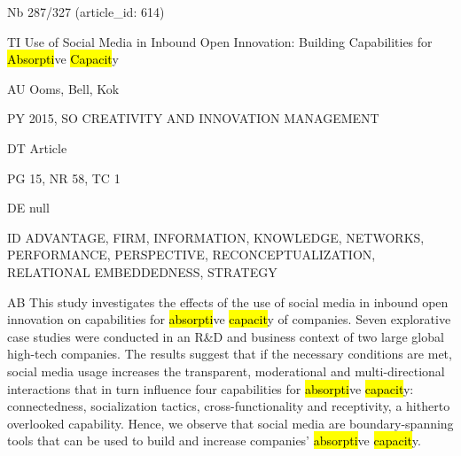 \documentclass[a4paper]{article}
\begin{document}
\vspace*{-2cm}
Nb \tabto{0cm}287/327 (article\_id: 614)\par
TI \tabto{0cm}Use of Social Media in Inbound Open Innovation: Building Capabilities for \hl{Absorpti}ve \hl{Capacit}y\par
AU \tabto{0cm}Ooms, Bell, Kok\par
PY \tabto{0cm}2015, SO CREATIVITY AND INNOVATION MANAGEMENT\par
DT \tabto{0cm}Article\par
PG \tabto{0cm}15, NR 58, TC 1\par
DE \tabto{0cm}null\par
ID \tabto{0cm}ADVANTAGE, FIRM, INFORMATION, KNOWLEDGE, NETWORKS, PERFORMANCE, PERSPECTIVE, RECONCEPTUALIZATION, RELATIONAL EMBEDDEDNESS, STRATEGY\par
AB \tabto{0cm}This study investigates the effects of the use of social media in inbound open innovation on capabilities for \hl{absorpti}ve \hl{capacit}y of companies. Seven explorative case studies were conducted in an R\&D and business context of two large global high-tech companies. The results suggest that if the necessary conditions are met, social media usage increases the transparent, moderational and multi-directional interactions that in turn influence four capabilities for \hl{absorpti}ve \hl{capacit}y: connectedness, socialization tactics, cross-functionality and receptivity, a hitherto overlooked capability. Hence, we observe that social media are boundary-spanning tools that can be used to build and increase companies' \hl{absorpti}ve \hl{capacit}y.\par
\clearpage
\end{document}
